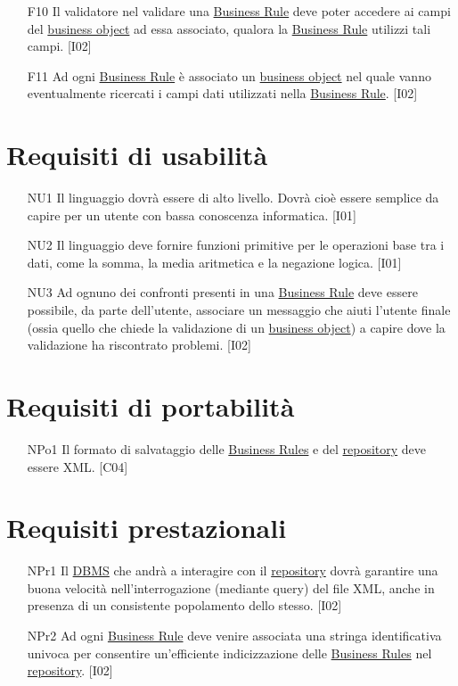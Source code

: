 \begin{itemize}
\item[F10]{Il validatore nel validare una \underline{Business Rule} deve poter accedere ai campi del \underline{business object} ad essa associato, qualora la \underline{Business Rule} utilizzi tali campi. [I02]}
\item[F11]{Ad ogni \underline{Business Rule} \`e associato un \underline{business object} nel quale vanno eventualmente ricercati i campi dati utilizzati nella \underline{Business Rule}. [I02]}
\end{itemize}

\section{Requisiti di usabilit\`a}
\begin{itemize}
\item[NU1]{Il linguaggio dovr\`a essere di alto livello. Dovr\`a cio\`e essere semplice da capire per un utente con bassa conoscenza informatica. [I01]}
\item[NU2]{Il linguaggio deve fornire funzioni primitive per le operazioni base tra i dati, come la somma, la media aritmetica e la negazione logica. [I01]}
\item[NU3]{Ad ognuno dei confronti presenti in una \underline{Business Rule} deve essere possibile, da parte dell'utente, associare un messaggio che aiuti l'utente finale (ossia quello che chiede la validazione di un \underline{business object}) a capire dove la validazione ha riscontrato problemi. [I02]}
\end{itemize}

\section{Requisiti di portabilit\`a}
\begin{itemize}
\item[NPo1]{Il formato di salvataggio delle \underline{Business Rules} e del \underline{repository} deve essere XML. [C04]}
\end{itemize}
\section{Requisiti prestazionali}
\begin{itemize}
 \item[NPr1]{Il \underline{DBMS} che andr\`a a interagire con il \underline{repository} dovr\`a garantire una buona velocit\`a nell'interrogazione (mediante query) del file XML, anche in presenza di un consistente popolamento dello stesso. [I02]}
\item[NPr2]{Ad ogni \underline{Business Rule} deve venire associata una stringa identificativa univoca per consentire un'efficiente indicizzazione delle \underline{Business Rules} nel \underline{repository}. [I02]}
\end{itemize}

